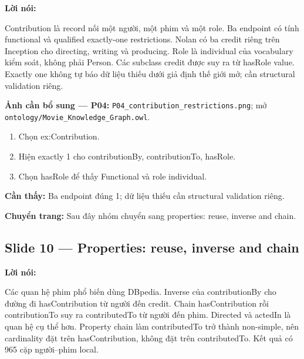 \documentclass[
  11pt,
]{article}
\providecommand{\tightlist}{%
  \setlength{\itemsep}{0pt}\setlength{\parskip}{0pt}}
\begin{document}
\textbf{Lời nói:}

Contribution là record nối một người, một phim và một role. Ba endpoint
có tính functional và qualified exactly-one
restrict\allowbreak{}ions.\allowbreak{} Nolan có ba credit riêng trên
Inception cho directing, writing và producing. Role là individual của
vocabulary kiểm soát, không phải Person. Các subclass credit được suy ra
từ hasRole value. Exactly one không tự báo dữ liệu thiếu dưới giả định
thế giới mở; cần structural validation riêng.

\textbf{Ảnh cần bổ sung --- P04:}
\texttt{P04\_\allowbreak{}cont\allowbreak{}ribution\allowbreak{}\_\allowbreak{}restric\allowbreak{}tions.\allowbreak{}pn\allowbreak{}g};
mở
\texttt{ontology\allowbreak{}/\allowbreak{}\allowbreak{}Movie\_\allowbreak{}\allowbreak{}K\allowbreak{}nowledge\allowbreak{}\_\allowbreak{}\allowbreak{}Graph.\allowbreak{}o\allowbreak{}wl}.

\begin{enumerate}
\def\labelenumi{\arabic{enumi}.}
\tightlist
\item
  Chọn
  ex:\allowbreak{}\allowbreak{}Contr\allowbreak{}ibution.\allowbreak{}
\item
  Hiện exactly 1 cho contribu\allowbreak{}tion\allowbreak{}By,
  contribu\allowbreak{}tion\allowbreak{}To, hasRole.
\item
  Chọn hasRole để thấy Functional và role individual.
\end{enumerate}

\textbf{Cần thấy:} Ba endpoint đúng 1; dữ liệu thiếu cần structural
validation riêng.

\textbf{Chuyển trang:} Sau đây nhóm chuyển sang properties: reuse,
inverse and chain.

\subsection{Slide 10 --- Properties: reuse, inverse and
chain}\label{slide-10-properties-reuse-inverse-and-chain}

\textbf{Lời nói:}

Các quan hệ phim phổ biến dùng DBpedia. Inverse của
contribu\allowbreak{}tion\allowbreak{}By cho đường đi
has\allowbreak{}Contr\allowbreak{}ibution từ người đến credit. Chain
has\allowbreak{}Contr\allowbreak{}ibution rồi
contribu\allowbreak{}tion\allowbreak{}To suy ra
contribu\allowbreak{}ted\allowbreak{}To từ người đến phim. Directed và
actedIn là quan hệ cụ thể hơn. Property chain làm
contribu\allowbreak{}ted\allowbreak{}To trở thành non-simple, nên
cardinality đặt trên
has\allowbreak{}Contr\allowbreak{}ibution,\allowbreak{} không đặt trên
contribu\allowbreak{}ted\allowbreak{}To.\allowbreak{} Kết quả có 965 cặp
người--phim local.
\end{document}
